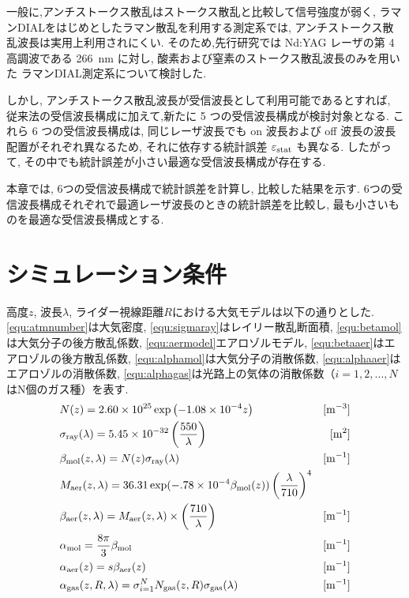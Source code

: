 一般に,アンチストークス散乱はストークス散乱と比較して信号強度が弱く,
ラマンDIALをはじめとしたラマン散乱を利用する測定系では, 
アンチストークス散乱波長は実用上利用されにくい.
そのため,先行研究では Nd:YAG レーザの第 4 高調波である \qty{266}{nm} に対し,
酸素および窒素のストークス散乱波長のみを用いた
ラマンDIAL測定系について検討した\cite{Previous_research}.

しかし, アンチストークス散乱波長が受信波長として利用可能であるとすれば,
従来法の受信波長構成に加えて,新たに 5 つの受信波長構成が検討対象となる.
これら 6 つの受信波長構成は, 
同じレーザ波長でも on 波長および off 波長の波長配置がそれぞれ異なるため,
それに依存する統計誤差 $\varepsilon_{\mathrm{stat}}$ も異なる.
したがって, その中でも統計誤差が小さい最適な受信波長構成が存在する.

本章では, 6つの受信波長構成で統計誤差を計算し, 比較した結果を示す.
6つの受信波長構成それぞれで最適レーザ波長のときの統計誤差を比較し, 
最も小さいものを最適な受信波長構成とする. 

\newpage
\section{シミュレーション条件}
高度$z$, 波長$\lambda$, ライダー視線距離$R$における大気モデルは以下の通りとした. 
\cref{equ:atmnumber}は大気密度, 
\cref{equ:sigmaray}はレイリー散乱断面積, 
\cref{equ:betamol}は大気分子の後方散乱係数,
\cref{equ:aermodel}エアロゾルモデル, 
\cref{equ:betaaer}はエアロゾルの後方散乱係数, 
\cref{equ:alphamol}は大気分子の消散係数, 
\cref{equ:alphaaer}はエアロゾルの消散係数, 
\cref{equ:alphagas}は光路上の気体の消散係数（$i=1,2,...,N$はN個のガス種）を表す.
\begin{align}
    &N(z)
    =2.60\times10^{25}\exp\left(
        -1.08\times10^{-4}z
    \right)&[\si{m^{-3}}]
    \label{equ:atmnumber}\\
    &\subrm{\sigma}{ray}(\lambda)
    =5.45\times10^{-32}\left(\frac{550}{\lambda}\right)&[\si{m^{2}}]
    \label{equ:sigmaray}\\
    &\subrm{\beta}{mol}(z, \lambda)
    =N(z)\subrm{\sigma}{ray}(\lambda)&[\si{m^{-1}}]
    \label{equ:betamol}\\
    &\subrm{M}{aer}(z, \lambda)
    =36.31\exp(-.78\times10^{-4}\subrm{\beta}{mol}(z))\left(\frac{\lambda}{710}\right)^4
    \label{equ:aermodel}\\
    &\subrm{\beta}{aer}(z, \lambda)
    =\subrm{M}{aer}(z, \lambda)\times\left(\frac{710}{\lambda}\right)&[\si{m^{-1}}]
    \label{equ:betaaer}\\
    &\subrm{\alpha}{mol}=\frac{8\pi}{3}\subrm{\beta}{mol}&[\si{m^{-1}}]
    \label{equ:alphamol}\\
    &\subrm{\alpha}{aer}(z)
    =s\subrm{\beta}{aer}(z)&[\si{m^{-1}}]
    \label{equ:alphaaer}\\
    &\subrm{\alpha}{gas}(z, R, \lambda)
    =\sigma_{i=1}^{N}\subrm{N}{gas}(z, R)\subrm{\sigma}{gas}(\lambda)&[\si{m^{-1}}]
    \label{equ:alphagas}
\end{align}

